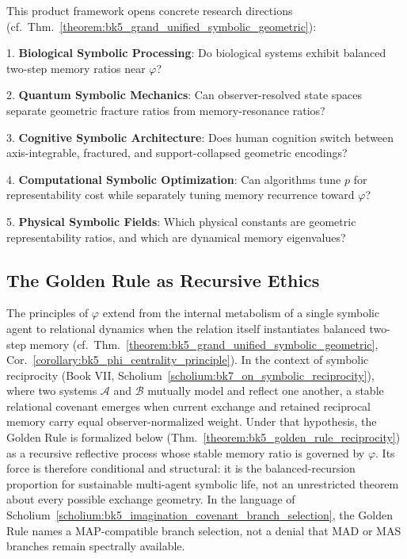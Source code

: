 \begin{remark}
\label{remark:bk5_open_frontiers}
This product framework opens concrete research directions
(cf.~Thm.~\ref{theorem:bk5_grand_unified_symbolic_geometric}):

1. \textbf{Biological Symbolic Processing}: Do biological systems exhibit balanced two-step memory ratios near $\varphi$?

2. \textbf{Quantum Symbolic Mechanics}: Can observer-resolved state spaces separate geometric fracture ratios from memory-resonance ratios?

3. \textbf{Cognitive Symbolic Architecture}: Does human cognition switch between axis-integrable, fractured, and support-collapsed geometric encodings?

4. \textbf{Computational Symbolic Optimization}: Can algorithms tune $p$ for representability cost while separately tuning memory recurrence toward $\varphi$?

5. \textbf{Physical Symbolic Fields}: Which physical constants are geometric representability ratios, and which are dynamical memory eigenvalues?
\end{remark}

\subsection{The Golden Rule as Recursive Ethics}
\label{subsec:bk5_golden_rule_ethics}

\begin{scholium}
\label{scholium:bk5_golden_rule_covenant}
The principles of $\varphi$ extend from the internal metabolism of a single
symbolic agent to relational dynamics when the relation itself instantiates
balanced two-step memory (cf.~Thm.~\ref{theorem:bk5_grand_unified_symbolic_geometric},
Cor.~\ref{corollary:bk5_phi_centrality_principle}).  In the context of symbolic reciprocity (Book VII,
Scholium~\ref{scholium:bk7_on_symbolic_reciprocity}), where two systems
$\mathcal{A}$ and $\mathcal{B}$ mutually model and reflect one another, a stable
relational covenant emerges when current exchange and retained reciprocal memory
carry equal observer-normalized weight.  Under that hypothesis, the Golden Rule
is formalized below (Thm.~\ref{theorem:bk5_golden_rule_reciprocity}) as a recursive
reflective process whose stable memory ratio is governed by $\varphi$.  Its force is
therefore conditional and structural: it is the balanced-recursion proportion for
sustainable multi-agent symbolic life, not an unrestricted theorem about every
possible exchange geometry.  In the language of Scholium~\ref{scholium:bk5_imagination_covenant_branch_selection}, the Golden Rule names a MAP-compatible branch selection, not a denial that MAD or MAS branches remain spectrally available.
\end{scholium}

